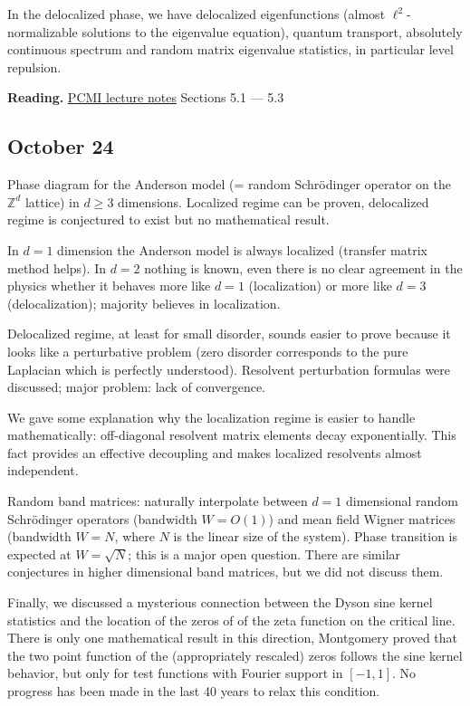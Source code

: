\documentclass[a4paper]{article}
\begin{document}
In the delocalized phase, we have delocalized eigenfunctions (\textquotedbl{}almost\textquotedbl{} $\ell^2$-normalizable solutions to the eigenvalue equation), quantum transport, absolutely continuous spectrum and random matrix eigenvalue statistics, in particular level repulsion.

\textbf{Reading.} \href{pcmi.pdf}{PCMI lecture notes} Sections 5.1 — 5.3


\subsection{October 24%
  \label{october-24}%
}

Phase diagram for the Anderson model (= random Schrödinger operator on the $\mathbb Z^d$ lattice) in $d\ge 3$ dimensions. Localized regime can be proven, delocalized regime is conjectured to exist but no mathematical result.

In $d=1$ dimension the Anderson model is always localized (transfer matrix method helps). In $d=2$ nothing is known, even there is no clear agreement in the physics whether it behaves more like $d=1$ (localization) or more like $d=3$ (delocalization); majority believes in localization.

Delocalized regime, at least for small disorder, sounds easier to prove because it looks like a perturbative problem (zero disorder corresponds to the pure Laplacian which is perfectly understood). Resolvent perturbation formulas were discussed; major problem: lack of convergence.

We gave some explanation why the localization regime is easier to handle mathematically: off-diagonal resolvent matrix elements decay exponentially. This fact provides an effective decoupling and makes localized resolvents almost independent.

Random band matrices: naturally interpolate between $d=1$ dimensional random Schrödinger operators (bandwidth $W=O(1)$) and mean field Wigner matrices (bandwidth $W = N$, where $N$ is the linear size of the system). Phase transition is expected at $W = \sqrt{N}$; this is a major open question. There are similar conjectures in higher dimensional band matrices, but we did not discuss them.

Finally, we discussed a mysterious connection between the Dyson sine kernel statistics and the location of the zeros of of the zeta function on the critical line. There is only one mathematical result in this direction, Montgomery proved that the two point function of the (appropriately rescaled) zeros follows the sine kernel behavior, but only for test functions with Fourier support in $[-1,1]$. No progress has been made in the last 40 years to relax this condition.
\end{document}
